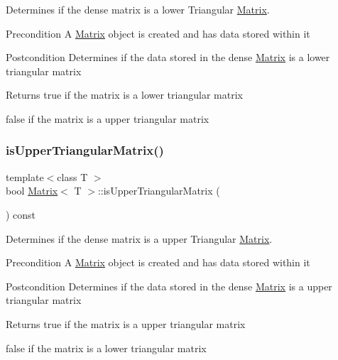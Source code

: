Determines if the dense matrix is a lower Triangular \mbox{\hyperlink{class_matrix}{Matrix}}. 

\begin{DoxyPrecond}{Precondition}
A \mbox{\hyperlink{class_matrix}{Matrix}} object is created and has data stored within it 
\end{DoxyPrecond}
\begin{DoxyPostcond}{Postcondition}
Determines if the data stored in the dense \mbox{\hyperlink{class_matrix}{Matrix}} is a lower triangular matrix
\end{DoxyPostcond}
\begin{DoxyReturn}{Returns}
true if the matrix is a lower triangular matrix 

false if the matrix is a upper triangular matrix 
\end{DoxyReturn}
\mbox{\label{class_matrix_a3d177e2d4c6d8ccf7a1c4c651f4bc075}} 
\subsubsection{\texorpdfstring{isUpperTriangularMatrix()}{isUpperTriangularMatrix()}}
{\footnotesize\ttfamily template$<$class T $>$ \\
bool \mbox{\hyperlink{class_matrix}{Matrix}}$<$ T $>$\+::is\+Upper\+Triangular\+Matrix (\begin{DoxyParamCaption}{ }\end{DoxyParamCaption}) const}



Determines if the dense matrix is a upper Triangular \mbox{\hyperlink{class_matrix}{Matrix}}. 

\begin{DoxyPrecond}{Precondition}
A \mbox{\hyperlink{class_matrix}{Matrix}} object is created and has data stored within it 
\end{DoxyPrecond}
\begin{DoxyPostcond}{Postcondition}
Determines if the data stored in the dense \mbox{\hyperlink{class_matrix}{Matrix}} is a upper triangular matrix
\end{DoxyPostcond}
\begin{DoxyReturn}{Returns}
true if the matrix is a upper triangular matrix 

false if the matrix is a lower triangular matrix 
\end{DoxyReturn}
\mbox{\label{class_matrix_a9b987f07fb3d4fcf2b038cbfd6615650}} 

